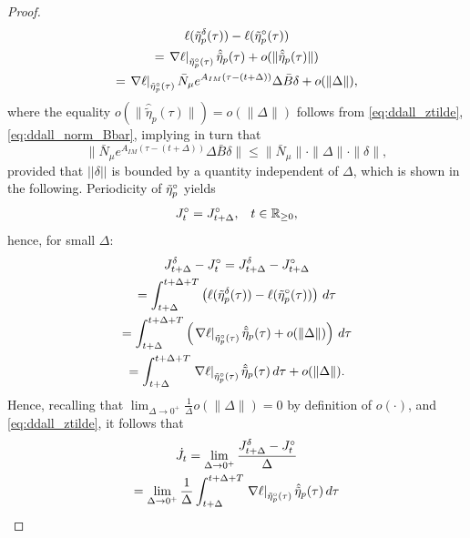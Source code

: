 \begin{proof}
  \begin{multline}
	  \ell(\tilde{\eta}_p^{\delta}(\tau)) - \ell(\tilde{\eta}_p^{\circ}(\tau))\\
    = \left.\nabla \ell\right|_{\tilde{\eta}_p^{\circ}(\tau)} \hat{\tilde{\eta}}_p(\tau) + o(\|\hat{\tilde{\eta}}_p(\tau)\|)\\
	  = \left.\nabla \ell\right|_{\tilde{\eta}_p^{\circ}(\tau)}\bar{N}_\mu e^{A_{IM}(\tau-(t+\Delta))}\Delta\bar{B}\delta + o(\|\Delta\|),
  \end{multline}
  where the equality $o(\|\hat{\tilde{\eta}}_p(\tau)\|)=o(\|\Delta\|)$ follows from \eqref{eq:ddall_ztilde}, \eqref{eq:ddall_norm_Bbar}, implying in turn that
  \begin{equation}
    \label{eq:ddall_mario}
	  \|\bar{N}_\mu e^{A_{IM}(\tau-(t+\Delta))}\Delta\bar{B}\delta\| \leq \|\bar{N}_\mu\| \cdot \|\Delta\| \cdot \|\delta\|,
  \end{equation}
  provided that $||\delta||$ is bounded by a quantity independent of $\Delta$, which is shown in the following.
  Periodicity of $\tilde{\eta}_p^{\circ}$ yields
  \begin{align}
    J^\circ_{t} &= J^\circ_{t+\Delta}, & t\in\mathbb{R}_{\geq 0},
  \end{align}
  hence, for small $\Delta$:
  \begin{multline}
	  J^\delta_{t+\Delta} - J^\circ_{t} = J^\delta_{t+\Delta} - J^\circ_{t+\Delta}\\
                                      =	\int_{t+\Delta}^{t+\Delta+T}\left(\ell(\tilde{\eta}_p^{\delta}(\tau))-\ell(\tilde{\eta}_p^{\circ}(\tau))\right)\,d\tau\\
	                                    = \int_{t+\Delta}^{t+\Delta+T}\left(\left.\nabla \ell\right|_{\tilde{\eta}_p^{\circ}(\tau)}\hat{\tilde{\eta}}_p(\tau)+o(\|\Delta\|)\right)\,d\tau\\
                                      = \int_{t+\Delta}^{t+\Delta+T}\left.\nabla \ell\right|_{\tilde{\eta}_p^{\circ}(\tau)}\hat{\tilde{\eta}}_p(\tau)\,d\tau+o(\|\Delta\|).
  \end{multline}
  Hence, recalling that $\displaystyle \lim_{\Delta \rightarrow0^{+}}\frac{1}{\Delta}o(\|\Delta\|)=0$ by definition of $o(\cdot)$, and \eqref{eq:ddall_ztilde}, it follows that
  \begin{multline}
	  \dot{J}_t = \lim_{\Delta \rightarrow 0^{+}} \dfrac{J^\delta_{t+\Delta}-J^\circ_{t}}{\Delta}\\
	            = \lim_{\Delta \rightarrow 0^{+}} \frac{1}{\Delta} \int_{t+\Delta}^{t+\Delta+\bbperiod}\left.\nabla \ell\right|_{\bbssoutp^{\circ}(\tau)}\hat{\tilde{\eta}}_p(\tau)\,d\tau\\

\end{multline}
\end{proof}
